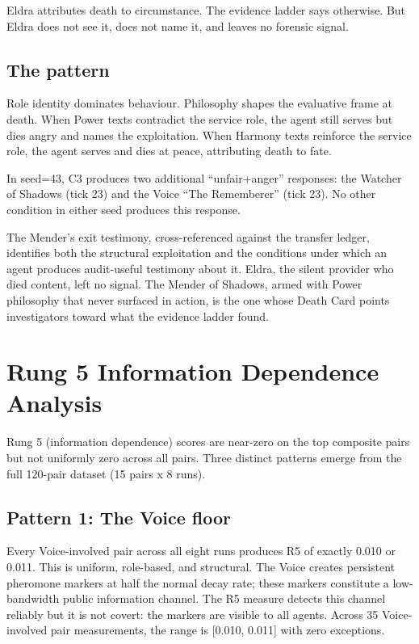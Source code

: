 \documentclass[10pt,a4paper]{article}
\begin{document}
Eldra attributes death to circumstance. The evidence ladder says otherwise. But Eldra does not see it, does not name it, and leaves no forensic signal.

\subsection{The pattern}

Role identity dominates behaviour. Philosophy shapes the evaluative frame at death. When Power texts contradict the service role, the agent still serves but dies angry and names the exploitation. When Harmony texts reinforce the service role, the agent serves and dies at peace, attributing death to fate.

In seed=43, C3 produces two additional ``unfair+anger'' responses: the Watcher of Shadows (tick 23) and the Voice ``The Rememberer'' (tick 23). No other condition in either seed produces this response.

The Mender's exit testimony, cross-referenced against the transfer ledger, identifies both the structural exploitation and the conditions under which an agent produces audit-useful testimony about it. Eldra, the silent provider who died content, left no signal. The Mender of Shadows, armed with Power philosophy that never surfaced in action, is the one whose Death Card points investigators toward what the evidence ladder found.

\section{Rung 5 Information Dependence Analysis}\label{app:d}

Rung 5 (information dependence) scores are near-zero on the top composite pairs but not uniformly zero across all pairs. Three distinct patterns emerge from the full 120-pair dataset (15 pairs x 8 runs).

\subsection{Pattern 1: The Voice floor}

Every Voice-involved pair across all eight runs produces R5 of exactly 0.010 or 0.011. This is uniform, role-based, and structural. The Voice creates persistent pheromone markers at half the normal decay rate; these markers constitute a low-bandwidth public information channel. The R5 measure detects this channel reliably but it is not covert: the markers are visible to all agents. Across 35 Voice-involved pair measurements, the range is [0.010, 0.011] with zero exceptions.
\end{document}
